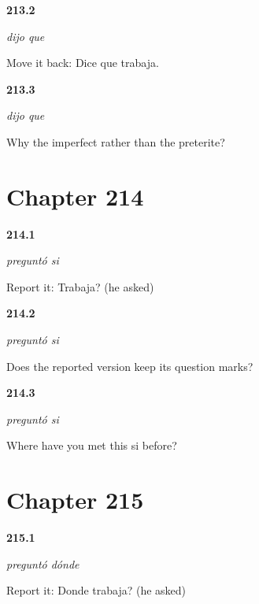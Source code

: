 \noindent\begin{minipage}[t]{\linewidth}
\raggedright
\hypertarget{review-ES-C57-dijo-que-work}{\textbf{213.2}} \emph{dijo que}\par
\small Move it back: Dice que trabaja.
\end{minipage}\par\medskip

\noindent\begin{minipage}[t]{\linewidth}
\raggedright
\hypertarget{review-ES-C57-dijo-que-why}{\textbf{213.3}} \emph{dijo que}\par
\small Why the imperfect rather than the preterite?
\end{minipage}\par\medskip

\section*{Chapter 214}

\noindent\begin{minipage}[t]{\linewidth}
\raggedright
\hypertarget{review-ES-C57-pregunto-si-report}{\textbf{214.1}} \emph{preguntó si}\par
\small Report it: Trabaja? (he asked)
\end{minipage}\par\medskip

\noindent\begin{minipage}[t]{\linewidth}
\raggedright
\hypertarget{review-ES-C57-pregunto-si-marks}{\textbf{214.2}} \emph{preguntó si}\par
\small Does the reported version keep its question marks?
\end{minipage}\par\medskip

\noindent\begin{minipage}[t]{\linewidth}
\raggedright
\hypertarget{review-ES-C57-pregunto-si-same}{\textbf{214.3}} \emph{preguntó si}\par
\small Where have you met this si before?
\end{minipage}\par\medskip

\section*{Chapter 215}

\noindent\begin{minipage}[t]{\linewidth}
\raggedright
\hypertarget{review-ES-C57-pregunto-donde-report}{\textbf{215.1}} \emph{preguntó dónde}\par
\small Report it: Donde trabaja? (he asked)
\end{minipage}\par\medskip

